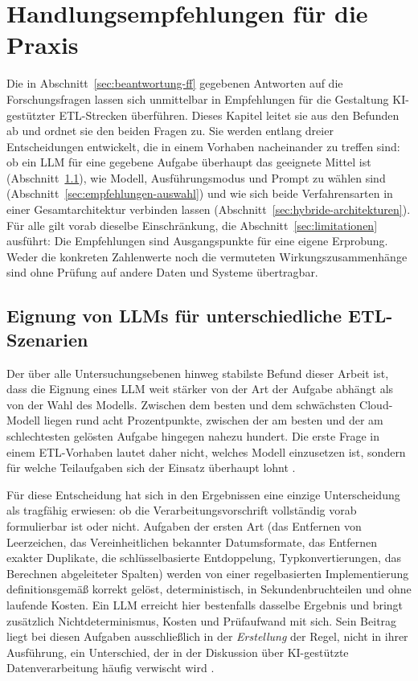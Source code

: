 
\chapter{Handlungsempfehlungen für die Praxis}
\label{ch:handlungsempfehlungen}

Die in Abschnitt~\ref{sec:beantwortung-ff} gegebenen Antworten auf die Forschungsfragen lassen sich unmittelbar in Empfehlungen für die Gestaltung \ac{KI}-gestützter \ac{ETL}-Strecken überführen. Dieses Kapitel leitet sie aus den Befunden ab und ordnet sie den beiden Fragen zu. Sie werden entlang dreier Entscheidungen entwickelt, die in einem Vorhaben nacheinander zu treffen sind: ob ein \ac{LLM} für eine gegebene Aufgabe überhaupt das geeignete Mittel ist (Abschnitt~\ref{sec:eignung}), wie Modell, Ausführungsmodus und Prompt zu wählen sind (Abschnitt~\ref{sec:empfehlungen-auswahl}) und wie sich beide Verfahrensarten in einer Gesamtarchitektur verbinden lassen (Abschnitt~\ref{sec:hybride-architekturen}). Für alle gilt vorab dieselbe Einschränkung, die Abschnitt~\ref{sec:limitationen} ausführt: Die Empfehlungen sind Ausgangspunkte für eine eigene Erprobung. Weder die konkreten Zahlenwerte noch die vermuteten Wirkungszusammenhänge sind ohne Prüfung auf andere Daten und Systeme übertragbar.

\section{Eignung von LLMs für unterschiedliche ETL-Szenarien}
\label{sec:eignung}

Der über alle Untersuchungsebenen hinweg stabilste Befund dieser Arbeit ist, dass die Eignung eines \ac{LLM} weit stärker von der Art der Aufgabe abhängt als von der Wahl des Modells. Zwischen dem besten und dem schwächsten Cloud-Modell liegen rund acht Prozentpunkte, zwischen der am besten und der am schlechtesten gelösten Aufgabe hingegen nahezu hundert. Die erste Frage in einem \ac{ETL}-Vorhaben lautet daher nicht, welches Modell einzusetzen ist, sondern für welche Teilaufgaben sich der Einsatz überhaupt lohnt \autocite{zhaoSurveyLargeLanguage2026,2026AIIndex}.

Für diese Entscheidung hat sich in den Ergebnissen eine einzige Unterscheidung als tragfähig erwiesen: ob die Verarbeitungsvorschrift vollständig vorab formulierbar ist oder nicht. Aufgaben der ersten Art (das Entfernen von Leerzeichen, das Vereinheitlichen bekannter Datumsformate, das Entfernen exakter Duplikate, die schlüsselbasierte Entdoppelung, Typkonvertierungen, das Berechnen abgeleiteter Spalten) werden von einer regelbasierten Implementierung definitionsgemäß korrekt gelöst, deterministisch, in Sekundenbruchteilen und ohne laufende Kosten. Ein \ac{LLM} erreicht hier bestenfalls dasselbe Ergebnis und bringt zusätzlich Nichtdeterminismus, Kosten und Prüfaufwand mit sich. Sein Beitrag liegt bei diesen Aufgaben ausschließlich in der \emph{Erstellung} der Regel, nicht in ihrer Ausführung, ein Unterschied, der in der Diskussion über \ac{KI}-gestützte Datenverarbeitung häufig verwischt wird \autocite{coteDataCleaningMachine2024,aAIEnhancedETLProcesses2025}.

